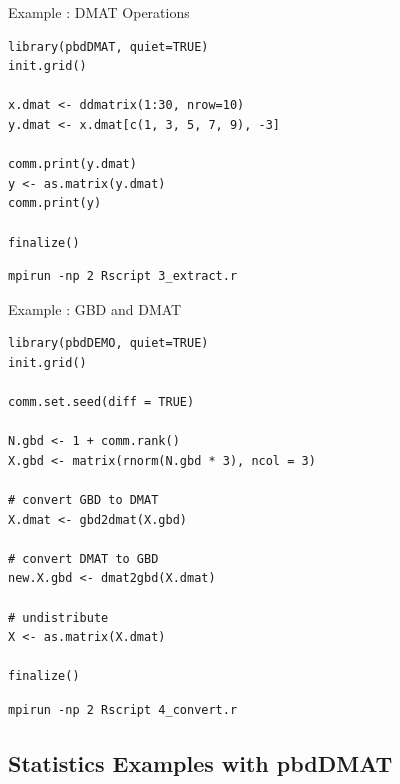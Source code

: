 \begin{frame}[fragile]
  \begin{exampleblock}{Example \countex:  DMAT Operations}\pause
\begin{lstlisting}[title=Generate locally only what is needed]
library(pbdDMAT, quiet=TRUE)
init.grid()

x.dmat <- ddmatrix(1:30, nrow=10)
y.dmat <- x.dmat[c(1, 3, 5, 7, 9), -3]

comm.print(y.dmat)
y <- as.matrix(y.dmat)
comm.print(y)

finalize()
\end{lstlisting}
\begin{lstlisting}[basicstyle=\tiny,backgroundcolor=\color{white},keywordstyle=\color{black},title=\fontsize{6pt}{7.2}\selectfont Execute this script via:]
mpirun -np 2 Rscript 3_extract.r
\end{lstlisting} 
  \end{exampleblock}
\end{frame}



\begin{frame}[fragile]
  \begin{exampleblock}{Example \countex:  GBD and DMAT}\pause
\begin{lstlisting}
library(pbdDEMO, quiet=TRUE)
init.grid()

comm.set.seed(diff = TRUE)

N.gbd <- 1 + comm.rank()
X.gbd <- matrix(rnorm(N.gbd * 3), ncol = 3)

# convert GBD to DMAT
X.dmat <- gbd2dmat(X.gbd)

# convert DMAT to GBD
new.X.gbd <- dmat2gbd(X.dmat)

# undistribute
X <- as.matrix(X.dmat)

finalize()
\end{lstlisting}
\begin{lstlisting}[basicstyle=\tiny,backgroundcolor=\color{white},keywordstyle=\color{black},title=\fontsize{6pt}{7.2}\selectfont Execute this script via:]
mpirun -np 2 Rscript 4_convert.r
\end{lstlisting} 
  \end{exampleblock}
\end{frame}



\subsection{Statistics Examples with pbdDMAT}

